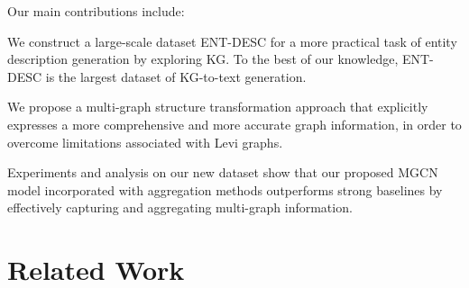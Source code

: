 \documentclass[11pt,a4paper]{article}
\newcommand{\squishlist}{
	\begin{list}{}
		{ \setlength{\itemsep}{0pt}
			\setlength{\parsep}{3pt}
			\setlength{\topsep}{3pt}
			\setlength{\partopsep}{0pt}
			\setlength{\leftmargin}{1.5em}
			\setlength{\labelwidth}{1em}
			\setlength{\labelsep}{0.5em} } }
\newcommand{\squishend}{
	\end{list} }
\begin{document}
Our main contributions include: 
\squishlist
\item
We construct a large-scale dataset ENT-DESC for a more practical task of entity description generation by exploring KG.
To the best of our knowledge, ENT-DESC is the largest dataset of KG-to-text generation.
\item
We propose a multi-graph structure transformation approach that explicitly expresses a more comprehensive and more accurate graph information, in order to overcome limitations associated with Levi graphs.
\item
Experiments and analysis on our new dataset show that our proposed MGCN model incorporated with aggregation methods outperforms strong baselines by effectively capturing and aggregating multi-graph information.


 \squishend


\section{Related Work}
\end{document}
